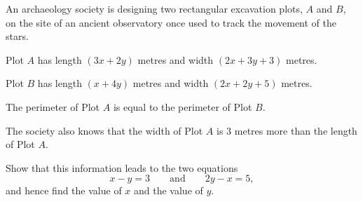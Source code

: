\begin{question}
\noindent An archaeology society is designing two rectangular excavation plots, $A$ and $B$, on the site of an ancient observatory once used to track the movement of the stars.

Plot $A$ has length $(3x + 2y)$ metres and width $(2x + 3y + 3)$ metres.

Plot $B$ has length $(x + 4y)$ metres and width $(2x + 2y + 5)$ metres.

\begin{center}
\end{center}

\noindent The perimeter of Plot $A$ is equal to the perimeter of Plot $B$.

\noindent The society also knows that the width of Plot $A$ is $3$ metres more than the length of Plot $A$.

\noindent Show that this information leads to the two equations
\[
x - y = 3 \qquad \text{and} \qquad 2y - x = 5,
\]
and hence find the value of $x$ and the value of $y$.

\vspace{6cm}

\begin{flushright}
\end{flushright}
\end{question}